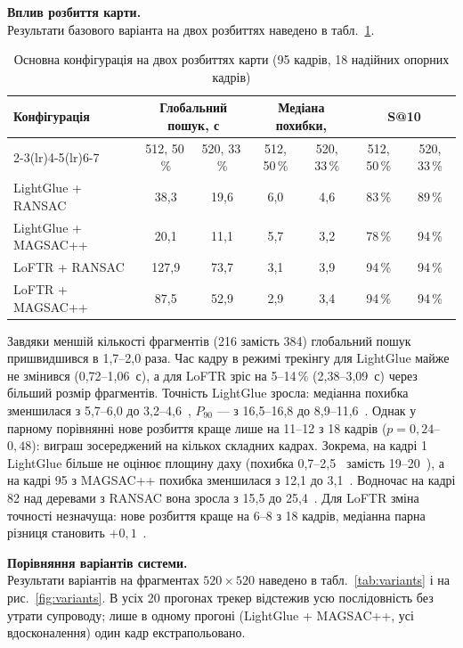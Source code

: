 \documentclass[a4paper, 12pt, titlepage]{article}
\begin{document}
\textbf{Вплив розбиття карти.}\\
Результати базового варіанта на двох розбиттях наведено в табл.~\ref{tab:tiling}.

\begin{table}[H]
\centering
\caption{Основна конфігурація на двох розбиттях карти (95 кадрів, 18 надійних опорних кадрів)}
\label{tab:tiling}
\small
\begin{tabular}{lcccccc}
\toprule
\multirow{2}{*}{\textbf{Конфігурація}} & \multicolumn{2}{c}{\textbf{Глобальний пошук, с}} & \multicolumn{2}{c}{\textbf{Медіана похибки, \px{}}} & \multicolumn{2}{c}{\textbf{S@10}} \\
\cmidrule(lr){2-3}\cmidrule(lr){4-5}\cmidrule(lr){6-7}
& 512, 50\,\% & 520, 33\,\% & 512, 50\,\% & 520, 33\,\% & 512, 50\,\% & 520, 33\,\% \\
\midrule
LightGlue + RANSAC   & 38,3  & 19,6 & 6,0 & 4,6 & 83\,\% & 89\,\% \\
LightGlue + MAGSAC++ & 20,1  & 11,1 & 5,7 & 3,2 & 78\,\% & 94\,\% \\
LoFTR + RANSAC       & 127,9 & 73,7 & 3,1 & 3,9 & 94\,\% & 94\,\% \\
LoFTR + MAGSAC++     & 87,5  & 52,9 & 2,9 & 3,4 & 94\,\% & 94\,\% \\
\bottomrule
\end{tabular}
\end{table}

Завдяки меншій кількості фрагментів (216 замість 384) глобальний пошук пришвидшився в 1,7--2,0 раза. Час кадру в режимі трекінгу для LightGlue майже не змінився (0,72--1,06~с), а для LoFTR зріс на 5--14\,\% (2,38--3,09~с) через більший розмір фрагментів. Точність LightGlue зросла: медіанна похибка зменшилася з 5,7--6,0 до 3,2--4,6~\px{}, $P_{90}$ --- з 16,5--16,8 до 8,9--11,6~\px{}. Однак у парному порівнянні нове розбиття краще лише на 11--12 з 18 кадрів ($p = 0{,}24$--$0{,}48$): виграш зосереджений на кількох складних кадрах. Зокрема, на кадрі 1 LightGlue більше не оцінює площину даху (похибка 0,7--2,5~\px{} замість 19--20~\px{}), а на кадрі 95 з MAGSAC++ похибка зменшилася з 12,1 до 3,1~\px{}. Водночас на кадрі 82 над деревами з RANSAC вона зросла з 15,5 до 25,4~\px{}. Для LoFTR зміна точності незначуща: нове розбиття краще на 6--8 з 18 кадрів, медіанна парна різниця становить $+0{,}1$~\px{}.

\textbf{Порівняння варіантів системи.}\\
Результати варіантів на фрагментах $520 \times 520$ наведено в табл.~\ref{tab:variants} і на рис.~\ref{fig:variants}. В усіх 20 прогонах трекер відстежив усю послідовність без утрати супроводу; лише в одному прогоні (LightGlue + MAGSAC++, усі вдосконалення) один кадр екстрапольовано.
\end{document}
